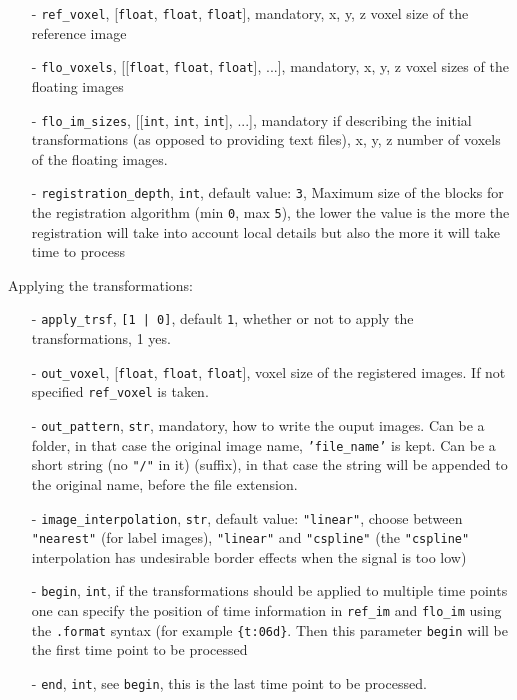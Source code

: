 \documentclass[10pt,a4paper]{book}
\newcommand{\option}[1]{{\texttt{'#1'}}}
\begin{document}
\begin{enumerate}
\item[-] \texttt{ref\_voxel}, [\texttt{float}, \texttt{float}, \texttt{float}], mandatory, x, y, z voxel size of the reference image
\item[-] \texttt{flo\_voxels}, [[\texttt{float}, \texttt{float}, \texttt{float}], ...], mandatory, x, y, z voxel sizes of the floating images
\item[-] \texttt{flo\_im\_sizes}, [[\texttt{int}, \texttt{int}, \texttt{int}], ...], mandatory if describing the initial transformations (as opposed to providing text files), x, y, z number of voxels of the floating images.
\item[-] \texttt{registration\_depth}, \texttt{int}, default value: \texttt{3}, Maximum size of the blocks for the registration algorithm (min \texttt{0}, max \texttt{5}), the lower the value is the more the registration will take into account local details but also the more it will take time to process
\end{enumerate}
Applying the transformations:
\begin{enumerate}
\item[-] \texttt{apply\_trsf}, \texttt{[1 | 0]}, default \texttt{1}, whether or not to apply the transformations, 1 yes.
\item[-] \texttt{out\_voxel}, [\texttt{float}, \texttt{float}, \texttt{float}], voxel size of the registered images. If not specified \texttt{ref\_voxel} is taken.
\item[-] \texttt{out\_pattern}, \texttt{str}, mandatory, how to write the ouput images. Can be a folder, in that case the original image name, \option{file\_name} is kept. Can be a short string (no \texttt{"/"} in it) (suffix), in that case the string will be appended to the original name, before the file extension.
\item[-] \texttt{image\_interpolation}, \texttt{str}, default value: \texttt{"linear"}, choose between \texttt{"nearest"} (for label images), \texttt{"linear"} and \texttt{"cspline"} (the \texttt{"cspline"} interpolation has undesirable border effects when the signal is too low)
\item[-] \texttt{begin}, \texttt{int}, if the transformations should be applied to multiple time points one can specify the position of time information in \texttt{ref\_im} and \texttt{flo\_im} using the \texttt{.format} syntax (for example \texttt{\{t:06d\}}. Then this parameter \texttt{begin} will be the first time point to be processed
\item[-] \texttt{end},  \texttt{int}, see \texttt{begin}, this is the last time point to be processed.
\end{enumerate}
\end{document}
